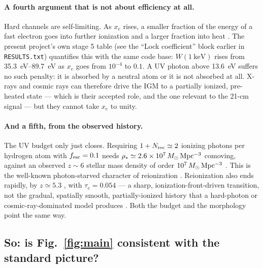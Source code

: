\documentclass[11pt,a4paper]{article}
\begin{document}
\paragraph{A fourth argument that is not about efficiency at all.}
Hard channels are self-limiting. As $x_e$ rises, a smaller fraction of the
energy of a fast electron goes into further ionization and a larger fraction
into heat \citep{shull85,valdes08,furlanetto10,chen04}. The present project's
own stage 5 table (see the ``Lock coefficient'' block earlier in
\texttt{RESULTS.txt}) quantifies this with the same code base:
$W(\SI{1}{\kilo\electronvolt})$ rises from
\SIrange{35.3}{89.7}{\electronvolt} as $x_e$ goes from $10^{-4}$ to $0.1$.
A UV photon above \SI{13.6}{\electronvolt} suffers no such penalty: it is
absorbed by a neutral atom or it is not absorbed at all. X-rays and cosmic
rays can therefore drive the IGM to a partially ionized, pre-heated state ---
which is their accepted role, and the one relevant to the 21-cm signal
\citep{mesinger13} --- but they cannot take $x_e$ to unity.

\paragraph{And a fifth, from the observed history.}
The UV budget only just closes. Requiring $1+N_{\rm rec}\simeq2$ ionizing
photons per hydrogen atom with $f_{\rm esc}=0.1$ needs
$\rho_\ast\simeq2.6\times10^{7}\,M_\odot\,{\rm Mpc^{-3}}$ comoving, against an
observed $z\sim6$ stellar mass density of order
$10^{7}\,M_\odot\,{\rm Mpc^{-3}}$ \citep{madau14}. This is the well-known
photon-starved character of reionization \citep{bolton07}. Reionization also
ends rapidly, by $z\simeq5.3$ \citep{bosman22}, with
$\tau_e=0.054$ \citep{planck18} --- a sharp, ionization-front-driven
transition, not the gradual, spatially smooth, partially-ionized history that
a hard-photon or cosmic-ray-dominated model produces
\citep{mesinger13}. Both the budget and the morphology point the same way.

\subsection{So: is Fig.~\ref{fig:main} consistent with the standard picture?}
\end{document}
